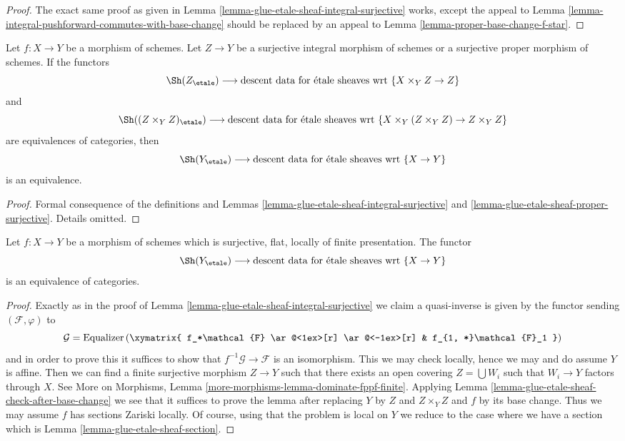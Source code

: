 \begin{proof}
The exact same proof as given in
Lemma \ref{lemma-glue-etale-sheaf-integral-surjective}
works, except the appeal to
Lemma \ref{lemma-integral-pushforward-commutes-with-base-change}
should be replaced by an appeal to
Lemma \ref{lemma-proper-base-change-f-star}.
\end{proof}

\begin{lemma}
\label{lemma-glue-etale-sheaf-check-after-base-change}
Let $f : X \to Y$ be a morphism of schemes. Let $Z \to Y$ be a surjective
integral morphism of schemes or a surjective proper morphism of schemes.
If the functors
$$
\Sh(Z_\etale)
\longrightarrow
\text{descent data for \'etale sheaves wrt }\{X \times_Y Z \to Z\}
$$
and
$$
\Sh((Z \times_Y Z)_\etale)
\longrightarrow
\text{descent data for \'etale sheaves wrt }
\{X \times_Y (Z \times_Y Z) \to Z \times_Y Z\}
$$
are equivalences of categories, then
$$
\Sh(Y_\etale)
\longrightarrow
\text{descent data for \'etale sheaves wrt }\{X \to Y\}
$$
is an equivalence.
\end{lemma}

\begin{proof}
Formal consequence of the definitions and
Lemmas \ref{lemma-glue-etale-sheaf-integral-surjective} and
\ref{lemma-glue-etale-sheaf-proper-surjective}. Details omitted.
\end{proof}

\begin{lemma}
\label{lemma-glue-etale-sheaf-fppf-cover}
Let $f : X \to Y$ be a morphism of schemes which is
surjective, flat, locally of finite presentation.
The functor
$$
\Sh(Y_\etale)
\longrightarrow
\text{descent data for \'etale sheaves wrt }\{X \to Y\}
$$
is an equivalence of categories.
\end{lemma}

\begin{proof}
Exactly as in the proof of
Lemma \ref{lemma-glue-etale-sheaf-integral-surjective}
we claim a quasi-inverse is given by the functor sending
$(\mathcal{F}, \varphi)$ to
$$
\mathcal{G} =
\text{Equalizer}\left(
\xymatrix{
f_*\mathcal{F}
\ar@<1ex>[r] \ar@<-1ex>[r] &
f_{1, *}\mathcal{F}_1
}
\right)
$$
and in order to prove this it suffices to show that
$f^{-1}\mathcal{G} \to \mathcal{F}$ is an isomorphism.
This we may check locally, hence we may and do assume $Y$
is affine. Then we can find a finite surjective morphism
$Z \to Y$ such that there exists an open covering
$Z = \bigcup W_i$ such that $W_i \to Y$ factors through $X$.
See
More on Morphisms, Lemma \ref{more-morphisms-lemma-dominate-fppf-finite}.
Applying Lemma
\ref{lemma-glue-etale-sheaf-check-after-base-change}
we see that it suffices to prove
the lemma after replacing $Y$ by $Z$ and $Z \times_Y Z$ and $f$
by its base change. Thus we may assume $f$ has sections Zariski locally.
Of course, using that the problem is local on $Y$ we reduce
to the case where we have a section which is
Lemma \ref{lemma-glue-etale-sheaf-section}.
\end{proof}

